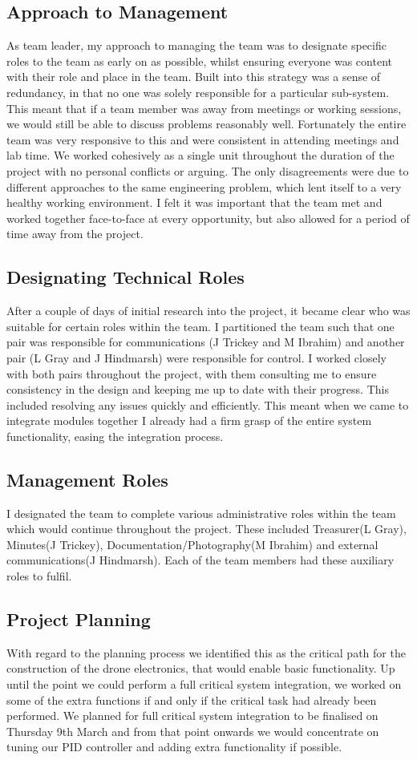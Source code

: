 \documentclass[a4paper,11pt]{article}
\begin{document}
\subsection{Approach to Management}
As team leader, my approach to managing the team was to designate specific roles to the team as early on as possible, whilst ensuring everyone was content with their role and place in the team. Built into this strategy was a sense of redundancy, in that no one was solely responsible for a particular sub-system. This meant that if a team member was away from meetings or working sessions, we would still be able to discuss problems reasonably well. Fortunately the entire team was very responsive to this and were consistent in attending meetings and lab time. We worked cohesively as a single unit throughout the duration of the project with no personal conflicts or arguing. The only disagreements were due to different approaches to the same engineering problem, which lent itself to a very healthy working environment. I felt it was important that the team met and worked together face-to-face at every opportunity, but also allowed for a period of time away from the project. 
\subsection{Designating Technical Roles}
After a couple of days of initial research into the project, it became clear who was suitable for certain roles within the team. I partitioned the team such that one pair was responsible for communications (J Trickey and M Ibrahim) and another pair (L Gray and J Hindmarsh) were responsible for control. I worked closely with both pairs throughout the project, with them consulting me to ensure consistency in the design and keeping me up to date with their progress. This included resolving any issues quickly and efficiently. This meant when we came to integrate modules together I already had a firm grasp of the entire system functionality, easing the integration process.
\subsection{Management Roles}
I designated the team to complete various administrative roles within the team which would continue throughout the project. These included Treasurer(L Gray), Minutes(J Trickey), Documentation/Photography(M Ibrahim) and external communications(J Hindmarsh). Each of the team members had these auxiliary roles to fulfil.
\subsection{Project Planning}
With regard to the planning process we identified this as the critical path for the construction of the drone electronics, that would enable basic functionality. Up until the point we could perform a full critical system integration, we worked on some of the extra functions if and only if the critical task had already been performed. We planned for full critical system integration to be finalised on Thursday 9th March and from that point onwards we would concentrate on tuning our PID controller and adding extra functionality if possible.
\end{document}
